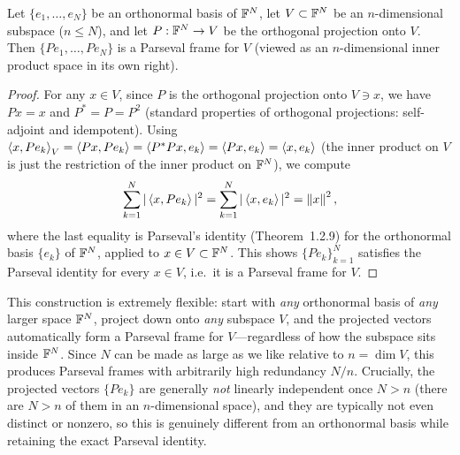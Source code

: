 \begin{theorem}
\label{thm:projection-parseval}
Let $\{e_1,\ldots,e_N\}$ be an orthonormal basis of $\mathbb{F}^N$, let
$V\subset\mathbb{F}^N$ be an $n$-dimensional subspace ($n \le N$), and let
$P:\mathbb{F}^N\to V$ be the orthogonal projection onto $V$. Then
$\{Pe_1,\ldots,Pe_N\}$ is a Parseval frame for $V$ (viewed as an
$n$-dimensional inner product space in its own right).
\end{theorem}

\begin{proof}
For any $x \in V$, since $P$ is the orthogonal projection onto $V \ni x$,
we have $Px = x$ and $P^*=P=P^2$ (standard properties of orthogonal
projections: self-adjoint and idempotent). Using
$\left\langle x, Pe_k \right\rangle_{V} = \left\langle Px, Pe_k \right\rangle = \left\langle P^*Px, e_k \right\rangle =
\left\langle Px, e_k \right\rangle = \left\langle x, e_k \right\rangle$ (the inner product on $V$ is just the
restriction of the inner product on $\mathbb{F}^N$), we compute
\[
  \sum_{k=1}^N |\left\langle x, Pe_k \right\rangle|^2
  = \sum_{k=1}^N |\left\langle x, e_k \right\rangle|^2
  = \left\| x \right\|^2,
\]
where the last equality is Parseval's identity (Theorem~1.2.9) for the
orthonormal basis $\{e_k\}$ of $\mathbb{F}^N$, applied to $x \in V \subset \mathbb{F}^N$.
This shows $\{Pe_k\}_{k=1}^N$ satisfies the Parseval identity for every
$x \in V$, i.e.\ it is a Parseval frame for $V$.
\end{proof}

\begin{remark*}
This construction is extremely flexible: start with \emph{any}
orthonormal basis of \emph{any} larger space $\mathbb{F}^N$, project down onto
\emph{any} subspace $V$, and the projected vectors automatically form a
Parseval frame for $V$---regardless of how the subspace sits inside
$\mathbb{F}^N$. Since $N$ can be made as large as we like relative to
$n=\dim V$, this produces Parseval frames with arbitrarily high
redundancy $N/n$. Crucially, the projected vectors $\{Pe_k\}$ are
generally \emph{not} linearly independent once $N>n$ (there are $N>n$ of
them in an $n$-dimensional space), and they are typically not even
distinct or nonzero, so this is genuinely different from an orthonormal
basis while retaining the exact Parseval identity.
\end{remark*}


